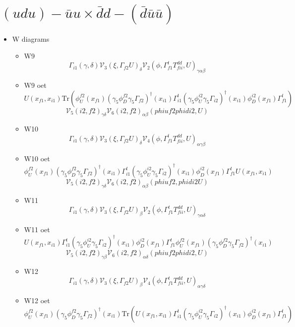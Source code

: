 \documentclass{article}[12pt]
\begin{document}
\section{$(udu)-\bar{u}u \times \bar{d}d-(\bar{d}\bar{u}\bar{u}) $}
\begin{itemize}
\item W diagrams
\begin{itemize}
\item W9
$$
\Gamma_{i1}\left(\gamma,\delta\right){\mathcal V}_3\left(\xi,\Gamma_{f2}U\right)_\delta{\mathcal V}_2\left(\phi,\Gamma_{f1}^tT^{dd}_{fii},U\right)_{\gamma\alpha\beta}
$$
\item W9 oet
$$
U(x_{f1},x_{i1})\mathrm{Tr}(\phi_U^{f2}(x_{f1})(\gamma_5\phi_D^{f2}\gamma_5\Gamma_{f2})^{\dagger}(x_{i1})\Gamma_{i1}^t(\gamma_5\phi_U^{i2}\gamma_5\Gamma_{i2})^{\dagger}(x_{i1})\phi_D^{i2}(x_{f1})\Gamma_{f1}^t)
$$
$$
{\mathcal V}_5(i2,f2)_{\gamma\delta}{\mathcal V}_6(i2,f2)_{\alpha\beta}(phiuf2phidi2,U)
$$
\item W10
$$
\Gamma_{i1}\left(\gamma,\delta\right){\mathcal V}_3\left(\xi,\Gamma_{f2}U\right)_\delta{\mathcal V}_4\left(\phi,\Gamma_{f1}^tT^{dd}_{fii},U\right)_{\alpha\gamma\beta}
$$
\item W10 oet
$$
\phi_U^{f2}(x_{f1})(\gamma_5\phi_D^{f2}\gamma_5\Gamma_{f2})^{\dagger}(x_{i1})\Gamma_{i1}^t(\gamma_5\phi_U^{i2}\gamma_5\Gamma_{i2})^{\dagger}(x_{i1})\phi_D^{i2}(x_{f1})\Gamma_{f1}^tU(x_{f1},x_{i1})
$$
$$
{\mathcal V}_5(i2,f2)_{\gamma\delta}{\mathcal V}_6(i2,f2)_{\alpha\beta}(phiuf2,phidi2U)
$$
\item W11
$$
\Gamma_{i1}\left(\gamma,\delta\right){\mathcal V}_3\left(\xi,\Gamma_{f2}U\right)_\beta{\mathcal V}_2\left(\phi,\Gamma_{f1}^tT^{dd}_{fii},U\right)_{\gamma\alpha\delta}
$$
\item W11 oet
$$
U(x_{f1},x_{i1})\Gamma_{i1}^t(\gamma_5\phi_U^{i2}\gamma_5\Gamma_{i2})^{\dagger}(x_{i1})\phi_D^{i2}(x_{f1})\Gamma_{f1}^t\phi_U^{f2}(x_{f1})(\gamma_5\phi_D^{f2}\gamma_5\Gamma_{f2})^{\dagger}(x_{i1})
$$
$$
{\mathcal V}_5(i2,f2)_{\gamma\beta}{\mathcal V}_6(i2,f2)_{\alpha\delta}(phiuf2phidi2,U)
$$
\item W12
$$
\Gamma_{i1}\left(\gamma,\delta\right){\mathcal V}_3\left(\xi,\Gamma_{f2}U\right)_\beta{\mathcal V}_4\left(\phi,\Gamma_{f1}^tT^{dd}_{fii},U\right)_{\alpha\gamma\delta}
$$
\item W12 oet
$$
\phi_U^{f2}(x_{f1})(\gamma_5\phi_D^{f2}\gamma_5\Gamma_{f2})^{\dagger}(x_{i1})\mathrm{Tr}(U(x_{f1},x_{i1})\Gamma_{i1}^t(\gamma_5\phi_U^{i2}\gamma_5\Gamma_{i2})^{\dagger}(x_{i1})\phi_D^{i2}(x_{f1})\Gamma_{f1}^t)
$$
\end{itemize}
\end{itemize}
\end{document}
